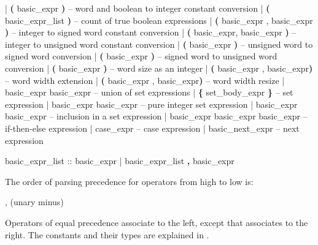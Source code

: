 \begin{Grammar}
    |  \textbf{(} basic_expr \textbf{)}          -- word and boolean to integer constant conversion
    |  \textbf{(} basic_expr_list \textbf{)}     -- count of true boolean expressions
    |  \textbf{(} basic_expr , basic_expr \textbf{)}        
                                    -- integer to signed word constant conversion
    |  \textbf{(} basic_expr, basic_expr \textbf{)}        
                                    -- integer to unsigned word constant conversion
    |  \textbf{(} basic_expr \textbf{)}         -- unsigned word to signed word conversion
    |  \textbf{(} basic_expr \textbf{)}       -- signed word to unsigned word conversion
    |  \textbf{(} basic_expr \textbf{)}         -- word size as an integer
    |  \textbf{(} basic_expr , basic_expr\textbf{)}  
                                    -- word width extension
    |  \textbf{(} basic_expr , basic_expr\textbf{)}  
                                    -- word width resize
    | basic_expr  basic_expr   -- union of set expressions 
    | \textbf{\{} set_body_expr \textbf{\}}             -- set expression
    | basic_expr  basic_expr      -- pure integer set expression
    | basic_expr  basic_expr      -- inclusion in a set expression
    | basic_expr  basic_expr \operator{:} basic_expr      
                                    -- if-then-else expression 
    | case_expr                     -- case expression
    | basic_next_expr               -- next expression

basic_expr_list ::
      basic_expr
    | basic_expr_list \textbf{,} basic_expr
\end{Grammar}

\noindent The order of parsing precedence for operators from high to
low is:
%
\begin{Grammar}
      \operator{[ ]}, \operator{[ : ]}
      \operator{!}
      \operator{::}
      \operator{-} (unary minus)
      \operator{*}   \operator{/}   
      \operator{+}   \operator{-}
      \operator{<<}   \operator{>>}
      \operator{=}   \operator{!=}   \operator{<}   \operator{>}   \operator{<=}   \operator{>=}
      \operator{\&}
      \operator{|}      
      \itebullet
      \operator{<->}
      \operator{->}
\end{Grammar}
%
Operators of equal precedence associate to the left, except \operator{->}
that associates to the right.
%
The constants and their types are explained in .

